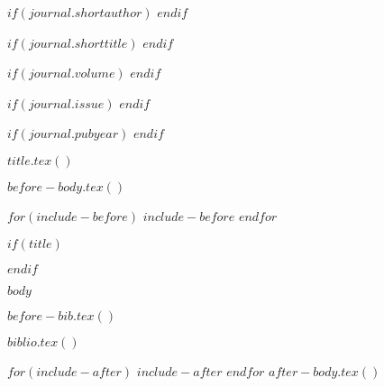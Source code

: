 
\setcounter{page}{1}

$if(journal.shortauthor)$
$endif$

$if(journal.shorttitle)$
$endif$

$if(journal.volume)$
$endif$

$if(journal.issue)$
$endif$

$if(journal.pubyear)$
$endif$

\BottomCatch

\CLline

$title.tex()$

$before-body.tex()$

$for(include-before)$
$include-before$
$endfor$

$if(title)$
\maketitle
$endif$

$body$

$before-bib.tex()$

$biblio.tex()$

$for(include-after)$
$include-after$
$endfor$
$after-body.tex()$

